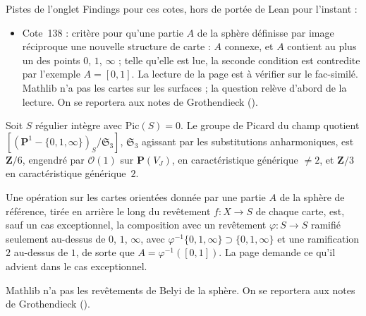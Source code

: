 \noindent Pistes de l'onglet Findings pour ces cotes, hors de portée de Lean pour l'instant :
\begin{itemize}\small\setlength{\itemsep}{0pt}
\item Cote~138 : critère pour qu'une partie $A$ de la sphère définisse par image réciproque une nouvelle structure de carte : $A$ connexe, et $A$ contient au plus un des points $0$, $1$, $\infty$ ; telle qu'elle est lue, la seconde condition est contredite par l'exemple $A = [0, 1]$. La lecture de la page est à vérifier sur le fac-similé. Mathlib n'a pas les cartes sur les surfaces ; la question relève d'abord de la lecture. On se reportera aux notes de Grothendieck ().
\end{itemize}

\begin{encadre}
\begin{theoreme*}\nonverifie
Soit $S$ régulier intègre avec $\mathrm{Pic}(S) = 0$. Le groupe de Picard du champ quotient $[(\mathbf P^1 - \{0, 1, \infty\})_S/\mathfrak S_3]$, $\mathfrak S_3$ agissant par les substitutions anharmoniques, est $\mathbf Z/6$, engendré par $\mathcal O(1)$ sur $\mathbf P(V_J)$, en caractéristique générique $\neq 2$, et $\mathbf Z/3$ en caractéristique générique~$2$.
\end{theoreme*}
\end{encadre}

\begin{encadre}
\begin{theoreme*}\nonverifie
Une opération sur les cartes orientées donnée par une partie $A$ de la sphère de référence, tirée en arrière le long du revêtement $f : X \to S$ de chaque carte, est, sauf un cas exceptionnel, la composition avec un revêtement $\varphi : S \to S$ ramifié seulement au-dessus de $0$, $1$, $\infty$, avec $\varphi^{-1}\{0, 1, \infty\} \supset \{0, 1, \infty\}$ et une ramification $2$ au-dessus de $1$, de sorte que $A = \varphi^{-1}([0, 1])$. La page demande ce qu'il advient dans le cas exceptionnel.
\end{theoreme*}
\end{encadre}
{\small Mathlib n'a pas les revêtements de Belyi de la sphère. On se reportera aux notes de Grothendieck ().\par}


